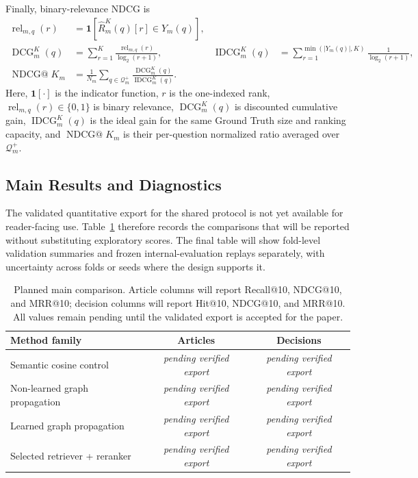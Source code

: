 \documentclass[runningheads]{llncs}
\newcommand{\pending}{\emph{pending verified export}}
\begin{document}
Finally, binary-relevance NDCG is
\begin{align}
  \operatorname{rel}_{m,q}(r)&=
  \mathbf{1}\!\left[\widehat{R}_m^K(q)[r]\in Y_m(q)\right],\\
  \operatorname{DCG}_m^K(q)&=
  \sum_{r=1}^{K}\frac{\operatorname{rel}_{m,q}(r)}{\log_2(r+1)},
  &
  \operatorname{IDCG}_m^K(q)&=
  \sum_{r=1}^{\min(|Y_m(q)|,K)}\frac{1}{\log_2(r+1)},\\
  \operatorname{NDCG@}K_m&=
  \frac{1}{N_m}\sum_{q\in\mathcal{Q}_m^+}
  \frac{\operatorname{DCG}_m^K(q)}{\operatorname{IDCG}_m^K(q)}.
  \label{eq:ndcg}
\end{align}
Here, \(\mathbf{1}[\cdot]\) is the indicator function, \(r\) is the one-indexed rank, \(\operatorname{rel}_{m,q}(r)\in\{0,1\}\) is binary relevance, \(\operatorname{DCG}_m^K(q)\) is discounted cumulative gain, \(\operatorname{IDCG}_m^K(q)\) is the ideal gain for the same Ground Truth size and ranking capacity, and \(\operatorname{NDCG@}K_m\) is their per-question normalized ratio averaged over \(\mathcal{Q}_m^+\).

\subsection{Main Results and Diagnostics}

The validated quantitative export for the shared protocol is not yet available for reader-facing use. Table~\ref{tab:results} therefore records the comparisons that will be reported without substituting exploratory scores. The final table will show fold-level validation summaries and frozen internal-evaluation replays separately, with uncertainty across folds or seeds where the design supports it.

\begin{table}[!b]
  \caption{Planned main comparison. Article columns will report Recall@10, NDCG@10, and MRR@10; decision columns will report Hit@10, NDCG@10, and MRR@10. All values remain pending until the validated export is accepted for the paper.}
  \label{tab:results}
  \centering
  \small
  \begin{tabularx}{\textwidth}{@{}Xcc@{}}
    \toprule
    Method family & Articles & Decisions \\
    \midrule
    Semantic cosine control & \pending & \pending \\
    Non-learned graph propagation & \pending & \pending \\
    Learned graph propagation & \pending & \pending \\
    Selected retriever + reranker & \pending & \pending \\
    \bottomrule
  \end{tabularx}
\end{table}
\end{document}
